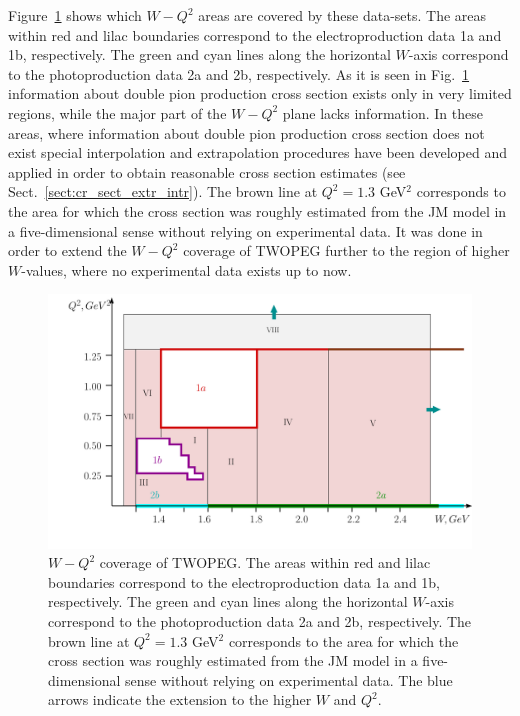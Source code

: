 Figure~\ref{fig:gen_cover} shows which $W-Q^2$ areas are covered by these data-sets. The areas within red and lilac boundaries correspond to the electroproduction data 1a and 1b, respectively. The green and cyan lines along the horizontal $W$-axis correspond to the photoproduction data 2a and 2b, respectively. As it is seen in Fig.~\ref{fig:gen_cover} information about double pion production cross section exists only in very limited regions, while the major part of the $W-Q^2$ plane lacks information. In these areas, where information about double pion production cross section does not exist special interpolation and extrapolation procedures have been developed and applied in order to obtain reasonable cross section estimates (see Sect.~\ref{sect:cr_sect_extr_intr}). The brown line at $Q^2 = 1.3$ GeV$^2$ corresponds to the area for which the cross section was roughly estimated  from the JM model in a five-dimensional sense without relying on experimental data. It was done in order to extend the $W-Q^2$ coverage of TWOPEG further to the region of higher $W$-values, where no experimental data exists up to now.

\begin{figure}[htp]
\begin{center}
\includegraphics[width=16cm]{pictures/obt_weights/gen_cover.pdf}
\caption{\small $W-Q^2$ coverage of TWOPEG. The areas within red and lilac boundaries correspond to the electroproduction data 1a and 1b, respectively. The green and cyan lines along the horizontal $W$-axis correspond to the photoproduction data 2a and 2b, respectively. The brown line at $Q^2 = 1.3$ GeV$^2$ corresponds to the area for which the cross section was roughly estimated  from the JM model in a five-dimensional sense without relying on experimental data. The blue arrows indicate the extension to the higher $W$ and $Q^2$.} \label{fig:gen_cover}
\end{center}
\end{figure}


